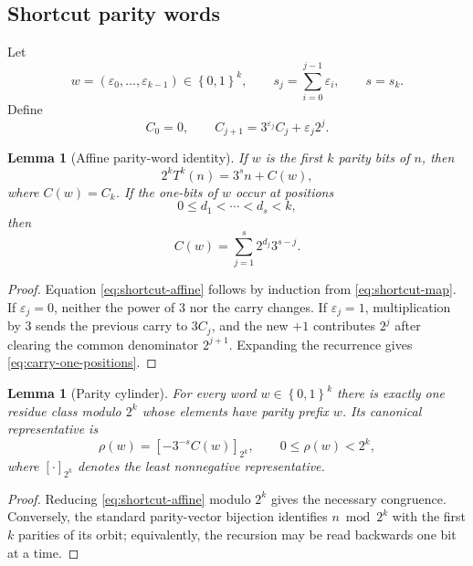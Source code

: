 \documentclass[11pt,reqno]{amsart}
\numberwithin{equation}{section}
\newtheorem{lemma}[theorem]{Lemma}
\theoremstyle{definition}
\theoremstyle{remark}
\newcommand{\eps}{\varepsilon}
\newcommand{\set}[1]{\left\{#1\right\}}
\begin{document}
\subsection{Shortcut parity words}

Let
\[
w=(\eps_0,\ldots,\eps_{k-1})\in\set{0,1}^k,
\qquad
s_j=\sum_{i=0}^{j-1}\eps_i,
\qquad s=s_k.
\]
Define
\begin{equation}\label{eq:shortcut-carry-rec}
C_0=0,
\qquad
C_{j+1}=3^{\eps_j}C_j+\eps_j2^j.
\end{equation}

\begin{lemma}[Affine parity-word identity]\label{lem:shortcut-affine}
If $w$ is the first $k$ parity bits of $n$, then
\begin{equation}\label{eq:shortcut-affine}
2^kT^k(n)=3^sn+C(w),
\end{equation}
where $C(w)=C_k$.
If the one-bits of $w$ occur at positions
\[
0\le d_1<\cdots<d_s<k,
\]
then
\begin{equation}\label{eq:carry-one-positions}
C(w)=\sum_{j=1}^{s}2^{d_j}3^{s-j}.
\end{equation}
\end{lemma}

\begin{proof}
Equation \eqref{eq:shortcut-affine} follows by induction from
\eqref{eq:shortcut-map}.  If $\eps_j=0$, neither the power of $3$ nor the
carry changes.  If $\eps_j=1$, multiplication by $3$ sends the previous
carry to $3C_j$, and the new $+1$ contributes $2^j$ after clearing the
common denominator $2^{j+1}$.  Expanding the recurrence gives
\eqref{eq:carry-one-positions}.
\end{proof}

\begin{lemma}[Parity cylinder]\label{lem:parity-cylinder}
For every word $w\in\set{0,1}^k$ there is exactly one residue class modulo
$2^k$ whose elements have parity prefix $w$.  Its canonical representative
is
\begin{equation}\label{eq:rho-shortcut}
\rho(w)=\left[-3^{-s}C(w)\right]_{2^k},
\qquad 0\le\rho(w)<2^k,
\end{equation}
where $[\cdot]_{2^k}$ denotes the least nonnegative representative.
\end{lemma}

\begin{proof}
Reducing \eqref{eq:shortcut-affine} modulo $2^k$ gives the necessary
congruence.  Conversely, the standard parity-vector bijection identifies
$n\bmod2^k$ with the first $k$ parities of its orbit; equivalently, the
recursion may be read backwards one bit at a time.
\end{proof}
\end{document}
